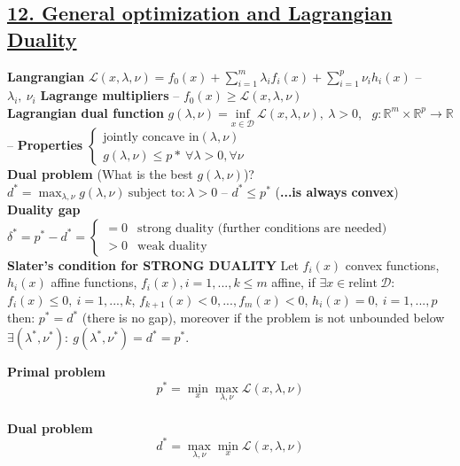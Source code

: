 \documentclass[a4paper]{article}
\begin{document}
\subsection*{\underline{12. General optimization and Lagrangian Duality}}
\textbf{Langrangian} $\mathcal{L}(x,\lambda, \nu)=f_0(x)+\sum_{i=1}^m{\lambda_i{f_i(x)}}+\sum_{i=1}^p{\nu_i{h_i(x)}}$ -- $\lambda_i, \ \nu_i$ \textbf{Lagrange multipliers} -- $f_0(x)\ge\mathcal{L}(x,\lambda,\nu)$\\
\textbf{Lagrangian dual function} $g(\lambda, \nu) = \underset{x\in\mathcal{D}}{\text{inf}} \ {\mathcal{L}(x, \lambda, \nu)}, \ \lambda>0$, \ $g:\mathbb{R}^m\times\mathbb{R}^p\to\mathbb{R}$ -- \textbf{Properties} $\begin{cases}
    \text{jointly concave in} (\lambda,\nu)\\
    g(\lambda,\nu)\le p* \ \forall \lambda>0, \forall \nu
\end{cases}$\\
\textbf{Dual problem} (What is the best $g(\lambda,\nu)$)? $d^*=\max_{\lambda,\nu} g(\lambda,\nu) \ \text{subject to}: \lambda>0 $ -- $d^*\le{p^*}$ (\textbf{...is always convex})\\
\textbf{Duality gap} $\delta^*=p^*-d^*=\begin{cases}
    =0&\text{strong duality (further conditions are needed)}\\
    >0&\text{weak duality}
\end{cases}$\\
\textbf{Slater's condition for STRONG DUALITY} Let $f_i(x)$ convex functions, $h_i(x)$ affine functions, $f_i(x), i=1,...,k\le{m}$ affine, if $\exists{x}\in\text{relint}\ \mathcal{D}$: $f_i(x)\le0, \ i=1,..., k$, $f_{k+1}(x)<0, ..., f_m(x)<0$, $h_i(x)=0, \ i=1,...,p$ then: $p^*=d^*$ (there is no gap), moreover if the problem is not unbounded below $\exists(\lambda^*,\nu^*): \ g(\lambda^*, \nu^*)=d^*=p^*. $\\
\vspace{-0.8cm}
\begin{multicols}{2}
    \noindent
    \textbf{Primal problem}
    \vspace{-0.2cm}
    \begin{equation*}
        p^*=\min_{x} \max_{\lambda,\nu} \mathcal{L}(x,\lambda,\nu)
    \end{equation*}
    \newcolumn\\
    \textbf{Dual problem}
    \vspace{-0.2cm}
    \begin{equation*}
        d^*=\max_{\lambda,\nu} \min_{x} \mathcal{L}(x,\lambda,\nu)
    \end{equation*}
\end{multicols}
\end{document}
